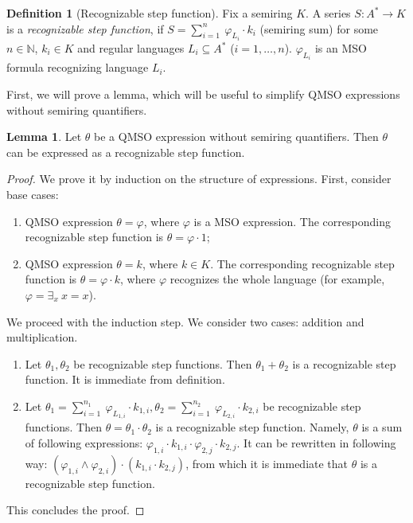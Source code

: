 \documentclass[en]{pracamgr}
\theoremstyle{definition}
\newtheorem{definition}{Definition}[section]
\newtheorem{lemma}[theorem]{Lemma}
\begin{document}
\begin{definition}[Recognizable step function]
    \label{DefRecStepFun}
    Fix a semiring $K$.
    A series $S: A^* \rightarrow K$ is a \emph{recognizable step function}, if $S = \sum_{i = 1}^{n} \ \varphi_{L_i} \cdot k_i$ (semiring sum) for some $n \in \mathbb{N}$, $k_i \in K$ and regular languages $L_i \subseteq A^*$ ($i=1,\ldots,n$). $\varphi_{L_i}$ is an MSO formula recognizing language $L_i$.
\end{definition}

First, we will prove a lemma, which will be useful to simplify QMSO expressions without semiring quantifiers.

\begin{lemma}
    \label{QFreeRecognizable}
    Let $\theta$ be a QMSO expression without semiring quantifiers. Then $\theta$ can be expressed as a recognizable step function.
\end{lemma}

\begin{proof}
    We prove it by induction on the structure of expressions.
    First, consider base cases:
    \begin{enumerate}
        \item QMSO expression $\theta = \varphi$, where $\varphi$ is a MSO expression. The corresponding recognizable step function is $\theta = \varphi \cdot 1$;
        \item QMSO expression $\theta = k$, where $k \in K$. The corresponding recognizable step function is $\theta = \varphi \cdot k$, where $\varphi$ recognizes the whole language (for example, $\varphi = \exists_x \ x = x$).
    \end{enumerate}

    We proceed with the induction step. We consider two cases: addition and multiplication.
    \begin{enumerate}
        \item Let $\theta_1, \theta_2$ be recognizable step functions. Then $\theta_1 + \theta_2$ is a recognizable step function. It is immediate from definition.
        \item Let $\theta_1 = \sum_{i = 1}^{n_1} \ \varphi_{L_{1,i}} \cdot k_{1,i}, \theta_2 = \sum_{i = 1}^{n_2} \ \varphi_{L_{2,i}} \cdot k_{2,i}$ be recognizable step functions. Then $\theta = \theta_1 \cdot \theta_2$ is a recognizable step function. Namely, $\theta$ is a sum of following expressions: $\varphi_{1,i} \cdot k_{1, i} \cdot \varphi_{2,j} \cdot k_{2,j}$. It can be rewritten in following way: $(\varphi_{1,i} \land \varphi_{2,i}) \cdot (k_{1,i} \cdot k_{2,j})$, from which it is immediate that $\theta$ is a recognizable step function.
    \end{enumerate}
This concludes the proof.
\end{proof}
\end{document}
